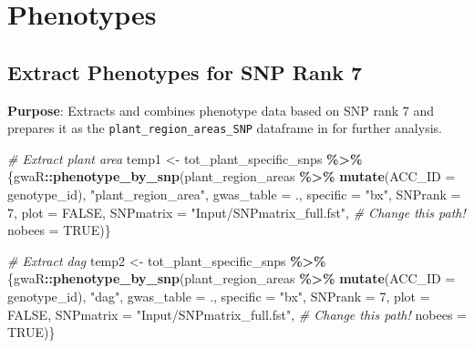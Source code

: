 \documentclass[
  11pt,
]{article}
\newenvironment{Shaded}{\begin{snugshade}}{\end{snugshade}}
\newcommand{\AttributeTok}[1]{\textcolor[rgb]{0.13,0.29,0.53}{#1}}
\newcommand{\CommentTok}[1]{\textcolor[rgb]{0.56,0.35,0.01}{\textit{#1}}}
\newcommand{\ConstantTok}[1]{\textcolor[rgb]{0.56,0.35,0.01}{#1}}
\newcommand{\DecValTok}[1]{\textcolor[rgb]{0.00,0.00,0.81}{#1}}
\newcommand{\FunctionTok}[1]{\textcolor[rgb]{0.13,0.29,0.53}{\textbf{#1}}}
\newcommand{\NormalTok}[1]{#1}
\newcommand{\OtherTok}[1]{\textcolor[rgb]{0.56,0.35,0.01}{#1}}
\newcommand{\SpecialCharTok}[1]{\textcolor[rgb]{0.81,0.36,0.00}{\textbf{#1}}}
\newcommand{\StringTok}[1]{\textcolor[rgb]{0.31,0.60,0.02}{#1}}
\begin{document}
\section{Phenotypes}\label{phenotypes}

\subsection{Extract Phenotypes for SNP Rank
7}\label{extract-phenotypes-for-snp-rank-7}

\textbf{Purpose}: Extracts and combines phenotype data based on SNP rank
7 and prepares it as the \texttt{plant\_region\_areas\_SNP} dataframe in
for further analysis.

\begin{Shaded}
\begin{Highlighting}[]
\CommentTok{\# Extract plant area}
\NormalTok{temp1 }\OtherTok{\textless{}{-}}\NormalTok{ tot\_plant\_specific\_snps }\SpecialCharTok{\%\textgreater{}\%}
\NormalTok{  \{gwaR}\SpecialCharTok{::}\FunctionTok{phenotype\_by\_snp}\NormalTok{(plant\_region\_areas }\SpecialCharTok{\%\textgreater{}\%} \FunctionTok{mutate}\NormalTok{(}\AttributeTok{ACC\_ID =}\NormalTok{ genotype\_id),}
                          \StringTok{"plant\_region\_area"}\NormalTok{,}
                          \AttributeTok{gwas\_table =}\NormalTok{ .,}
                          \AttributeTok{specific =} \StringTok{"bx"}\NormalTok{,}
                          \AttributeTok{SNPrank =} \DecValTok{7}\NormalTok{,}
                          \AttributeTok{plot =} \ConstantTok{FALSE}\NormalTok{, }
                          \AttributeTok{SNPmatrix =} \StringTok{"Input/SNPmatrix\_full.fst"}\NormalTok{, }\CommentTok{\# Change this path!}
                          \AttributeTok{nobees =} \ConstantTok{TRUE}\NormalTok{)\}}

\CommentTok{\# Extract dag}
\NormalTok{temp2 }\OtherTok{\textless{}{-}}\NormalTok{ tot\_plant\_specific\_snps }\SpecialCharTok{\%\textgreater{}\%} 
\NormalTok{  \{gwaR}\SpecialCharTok{::}\FunctionTok{phenotype\_by\_snp}\NormalTok{(plant\_region\_areas }\SpecialCharTok{\%\textgreater{}\%} \FunctionTok{mutate}\NormalTok{(}\AttributeTok{ACC\_ID =}\NormalTok{ genotype\_id),}
                          \StringTok{"dag"}\NormalTok{,}
                          \AttributeTok{gwas\_table =}\NormalTok{ .,}
                          \AttributeTok{specific =} \StringTok{"bx"}\NormalTok{,}
                          \AttributeTok{SNPrank =} \DecValTok{7}\NormalTok{,}
                          \AttributeTok{plot =} \ConstantTok{FALSE}\NormalTok{, }
                          \AttributeTok{SNPmatrix =} \StringTok{"Input/SNPmatrix\_full.fst"}\NormalTok{, }\CommentTok{\# Change this path!}
                          \AttributeTok{nobees =} \ConstantTok{TRUE}\NormalTok{)\}}


\end{Highlighting}
\end{Shaded}
\end{document}
